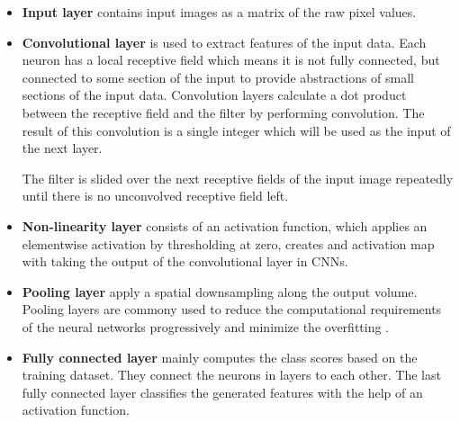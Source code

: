     \begin{itemize}

        \item \textbf{Input layer} contains input images as a matrix of the raw pixel values.

        \item \textbf{Convolutional layer} is used to extract features of the input data.
            Each neuron has a local receptive field which means it is not fully connected, but connected to some section of the input to provide abstractions of small sections of the input data.
            Convolution layers calculate a dot product between the receptive field and the filter by performing convolution.
            The result of this convolution is a single integer which will be used as the input of the next layer.

            

            The filter is slided over the next receptive fields of the input image repeatedly until there is no unconvolved receptive field left.

        \item \textbf{Non-linearity layer} consists of an activation function, which applies an elementwise activation by thresholding at zero, creates and activation map with taking the output of the convolutional layer in CNNs.

        \item \textbf{Pooling layer} apply a spatial downsampling along the output volume.
            Pooling layers are commony used to reduce the computational requirements of the neural networks progressively and minimize the overfitting \cite{Layersof6online}.

        \item \textbf{Fully connected layer} mainly computes the class scores based on the training dataset.
            They connect the neurons in layers to each other.
            The last fully connected layer classifies the generated features with the help of an activation function.

    \end{itemize}


